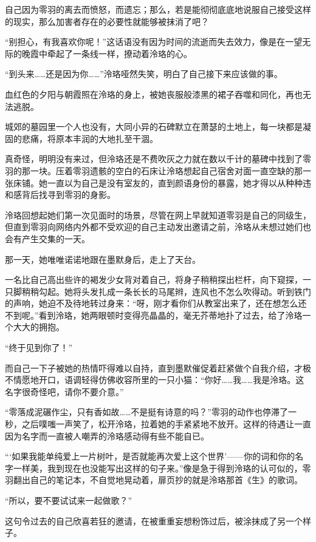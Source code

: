 \documentclass[UTF8, scheme = chinese, openany]{ctexbook}
\begin{document}
自己因为零羽的离去而愤怒，而遗忘；那么，若是能彻彻底底地说服自己接受这样的现实，那么加害者存在的必要性就能够被抹消了吧？

“别担心，有我喜欢你呢！”这话语没有因为时间的流逝而失去效力，像是在一望无际的晚霞中牵起了一条线一样，撩动着泠珞的心。

“到头来……还是因为你……”泠珞哑然失笑，明白了自己接下来应该做的事。

\vspace{1.5em}

血红色的夕阳与朝霞照在泠珞的身上，被她丧服般漆黑的裙子吞噬和同化，再也无法逃脱。

城郊的墓园里一个人也没有，大同小异的石碑默立在萧瑟的土地上，每一块都是凝固的悲痛，将原本丰润的大地扎至干涸。

真奇怪，明明没有来过，但泠珞还是不费吹灰之力就在数以千计的墓碑中找到了零羽的那一块。压着零羽遗骸的空白的石床让泠珞想起自己宿舍对面一直空缺的那一张床铺。她一直以为自己是没有室友的，直到颜语身份的暴露，她才得以从种种违和感背后找寻到零羽的身影。

泠珞回想起她们第一次见面时的场景，尽管在网上早就知道零羽是自己的同级生，但直到零羽向网络内外都不受欢迎的自己主动发出邀请之前，泠珞从未想过她们也会有产生交集的一天。

那一天，她唯唯诺诺地跟在墨默身后，走上了天台。

一名比自己高出些许的褐发少女背对着自己，将身子稍稍探出栏杆，向下窥探，一只脚稍稍勾起。她将头发扎成一条长长的马尾辫，连风也不怎么吹得动。听到铁门的声响，她迫不及待地转过身来：“呀，刚才看你们从教室出来了，还在想怎么还不到呢。”看到泠珞，她两眼顿时变得亮晶晶的，毫无芥蒂地扑了过去，给了泠珞一个大大的拥抱。

“终于见到你了！”

而自己一下子被她的热情吓得难以自持，直到墨默催促着赶紧做个自我介绍，才极不情愿地开口，语调轻得仿佛收容所里的一只小猫：“你好……我……我是泠珞。这名字很奇怪吧，请你不要介意。”

“零落成泥碾作尘，只有香如故……不是挺有诗意的吗？”零羽的动作也停滞了一秒，之后噗嗤一声笑了，松开泠珞，拉着她的手紧紧地不放开。这样的待遇让一直因为名字而一直被人嘲弄的泠珞感动得有些不能自已。

“‘如果我能单纯爱上一片树叶，是否就能再次爱上这个世界’——你的词和你的名字一样美，我到现在也没能写出这样的句子来。”像是急于得到泠珞的认可似的，零羽翻出自己的笔记本，不自觉地晃动着，扉页抄的就是泠珞那首《生》的歌词。

“所以，要不要试试来一起做歌？”

这句令过去的自己欣喜若狂的邀请，在被重重妄想粉饰过后，被涂抹成了另一个样子。
\end{document}
